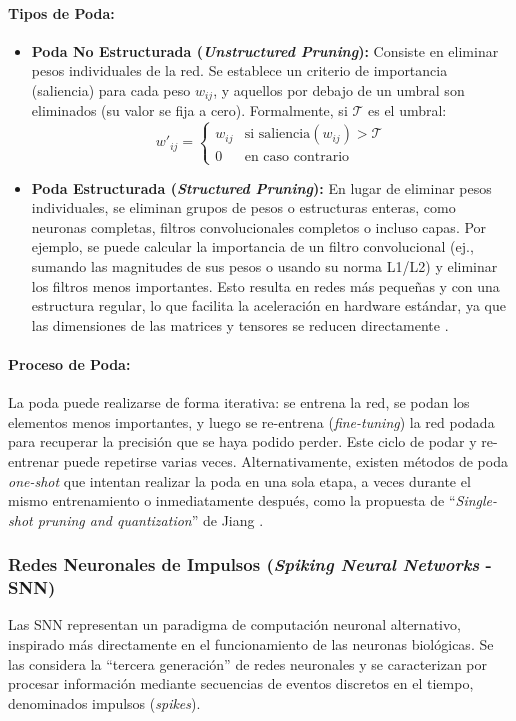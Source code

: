 \documentclass[12pt]{article}
\begin{document}
\paragraph{Tipos de Poda:}
\begin{itemize}
    \item \textbf{Poda No Estructurada (\textit{Unstructured Pruning}):} Consiste en eliminar pesos individuales de la red. Se establece un criterio de importancia (saliencia) para cada peso $w_{ij}$, y aquellos por debajo de un umbral son eliminados (su valor se fija a cero). Formalmente, si $\mathcal{T}$ es el umbral:
    \begin{equation}
    w'_{ij} = \begin{cases} w_{ij} & \text{si } \text{saliencia}(w_{ij}) > \mathcal{T} \\ 0 & \text{en caso contrario} \end{cases}
    \label{eq:poda_no_estructurada}
    \end{equation}
    \item \textbf{Poda Estructurada (\textit{Structured Pruning}):} En lugar de eliminar pesos individuales, se eliminan grupos de pesos o estructuras enteras, como neuronas completas, filtros convolucionales completos o incluso capas. Por ejemplo, se puede calcular la importancia de un filtro convolucional (ej., sumando las magnitudes de sus pesos o usando su norma L1/L2) y eliminar los filtros menos importantes. Esto resulta en redes más pequeñas y con una estructura regular, lo que facilita la aceleración en hardware estándar, ya que las dimensiones de las matrices y tensores se reducen directamente \cite{Liang2021PruningSurvey}.
\end{itemize}

\paragraph{Proceso de Poda:}
La poda puede realizarse de forma iterativa: se entrena la red, se podan los elementos menos importantes, y luego se re-entrena (\textit{fine-tuning}) la red podada para recuperar la precisión que se haya podido perder. Este ciclo de podar y re-entrenar puede repetirse varias veces. Alternativamente, existen métodos de poda \textit{one-shot} que intentan realizar la poda en una sola etapa, a veces durante el mismo entrenamiento o inmediatamente después, como la propuesta de ``\textit{Single-shot pruning and quantization}'' de Jiang \cite{Jiang2023SingleShot}.

\subsubsection{Redes Neuronales de Impulsos (\textit{Spiking Neural Networks} - SNN)}
\label{sssec:snn_exp}
Las SNN representan un paradigma de computación neuronal alternativo, inspirado más directamente en el funcionamiento de las neuronas biológicas. Se las considera la ``tercera generación'' de redes neuronales y se caracterizan por procesar información mediante secuencias de eventos discretos en el tiempo, denominados impulsos (\textit{spikes}).
\end{document}
